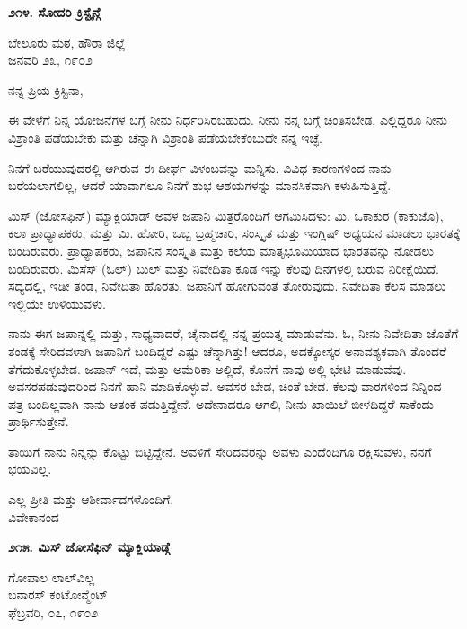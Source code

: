 \begin{center}
\textbf{೨೧೪. ಸೋದರಿ ಕ್ರಿಸ್ಟೈನ್ಗೆ}
\end{center}

\begin{flushright}
ಬೇಲೂರು ಮಠ, ಹೌರಾ ಜಿಲ್ಲೆ\\ಜನವರಿ ೨೩, ೧೯೦೨
\end{flushright}

ನನ್ನ ಪ್ರಿಯ ಕ್ರಿಸ್ಟಿನಾ,

ಈ ವೇಳೆಗೆ ನಿನ್ನ ಯೋಜನೆಗಳ ಬಗ್ಗೆ ನೀನು ನಿರ್ಧರಿಸಿರಬಹುದು. ನೀನು ನನ್ನ ಬಗ್ಗೆ ಚಿಂತಿಸಬೇಡ. ಎಲ್ಲಿದ್ದರೂ ನೀನು ವಿಶ್ರಾಂತಿ ಪಡೆಯಬೇಕು ಮತ್ತು ಚೆನ್ನಾಗಿ ವಿಶ್ರಾಂತಿ ಪಡೆಯಬೇಕೆಂಬುದೇ ನನ್ನ ಇಚ್ಛೆ.

ನಿನಗೆ ಬರೆಯುವುದರಲ್ಲಿ ಆಗಿರುವ ಈ ದೀರ್ಘ ವಿಳಂಬವನ್ನು ಮನ್ನಿಸು. ವಿವಿಧ ಕಾರಣಗಳಿಂದ ನಾನು ಬರೆಯಲಾಗಲಿಲ್ಲ, ಆದರೆ ಯಾವಾಗಲೂ ನಿನಗೆ ಶುಭ ಆಶಯಗಳನ್ನು ಮಾನಸಿಕವಾಗಿ ಕಳುಹಿಸುತ್ತಿದ್ದೆ.

ಮಿಸ್ (ಜೋಸಫಿನ್) ಮ್ಯಾಕ್ಲಿಯಾಡ್ ಅವಳ ಜಪಾನಿ ಮಿತ್ರರೊಂದಿಗೆ ಆಗಮಿಸಿದಳು: ಮಿ. ಒಕಾಕುರ (ಕಾಕುಜೊ), ಕಲಾ ಪ್ರಾಧ್ಯಾಪಕರು, ಮತ್ತು ಮಿ. ಹೋರಿ, ಒಬ್ಬ ಬ್ರಹ್ಮಚಾರಿ, ಸಂಸ್ಕೃತ ಮತ್ತು ಇಂಗ್ಲಿಷ್ ಅಧ್ಯಯನ ಮಾಡಲು ಭಾರತಕ್ಕೆ ಬಂದಿರುವರು. ಪ್ರಾಧ್ಯಾಪಕರು, ಜಪಾನಿನ ಸಂಸ್ಕೃತಿ ಮತ್ತು ಕಲೆಯ ಮಾತೃಭೂಮಿಯಾದ ಭಾರತವನ್ನು ನೋಡಲು ಬಂದಿರುವರು. ಮಿಸೆಸ್ (ಓಲ್) ಬುಲ್ ಮತ್ತು ನಿವೇದಿತಾ ಕೂಡ ಇನ್ನು ಕೆಲವು ದಿನಗಳಲ್ಲಿ ಬರುವ ನಿರೀಕ್ಷೆಯಿದೆ. ಸದ್ಯದಲ್ಲಿ, ಇಡೀ ತಂಡ, ನಿವೇದಿತಾ ಹೊರತು, ಜಪಾನಿಗೆ ಹೋಗುವಂತೆ ತೋರುವುದು. ನಿವೇದಿತಾ ಕೆಲಸ ಮಾಡಲು ಇಲ್ಲಿಯೇ ಉಳಿಯುವಳು.

ನಾನು ಈಗ ಜಪಾನ್ನಲ್ಲಿ ಮತ್ತು, ಸಾಧ್ಯವಾದರೆ, ಚೈನಾದಲ್ಲಿ ನನ್ನ ಪ್ರಯತ್ನ ಮಾಡುವೆನು. ಓ, ನೀನು ನಿವೇದಿತಾ ಜೊತೆಗೆ ತಂಡಕ್ಕೆ ಸೇರಿದವಳಾಗಿ ಜಪಾನಿಗೆ ಬಂದಿದ್ದರೆ ಎಷ್ಟು ಚೆನ್ನಾಗಿತ್ತು! ಆದರೂ, ಅದಕ್ಕೋಸ್ಕರ ಅನಾವಶ್ಯಕವಾಗಿ ತೊಂದರೆ ತೆಗೆದುಕೊಳ್ಳಬೇಡ. ಜಪಾನ್ ಇದೆ, ಮತ್ತು ಅಮೆರಿಕಾ ಅಲ್ಲಿದೆ, ಕೊನೆಗೆ ನಾವು ಅಲ್ಲಿ ಭೇಟಿ ಮಾಡುವೆವು. ಅವಸರಪಡುವುದರಿಂದ ನಿನಗೆ ಹಾನಿ ಮಾಡಿಕೊಳ್ಳುವೆ. ಅವಸರ ಬೇಡ, ಚಿಂತೆ ಬೇಡ. ಕೆಲವು ವಾರಗಳಿಂದ ನಿನ್ನಿಂದ ಪತ್ರ ಬಂದಿಲ್ಲವಾಗಿ ನಾನು ಆತಂಕ ಪಡುತ್ತಿದ್ದೇನೆ. ಅದೇನಾದರೂ ಆಗಲಿ, ನೀನು ಖಾಯಿಲೆ ಬೀಳದಿದ್ದರೆ ಸಾಕೆಂದು ಪ್ರಾರ್ಥಿಸುತ್ತೇನೆ.

ತಾಯಿಗೆ ನಾನು ನಿನ್ನನ್ನು ಕೊಟ್ಟು ಬಿಟ್ಟಿದ್ದೇನೆ. ಅವಳಿಗೆ ಸೇರಿದವರನ್ನು ಅವಳು ಎಂದೆಂದಿಗೂ ರಕ್ಷಿಸುವಳು, ನನಗೆ ಭಯವಿಲ್ಲ.

\begin{flushright}
ಎಲ್ಲ ಪ್ರೀತಿ ಮತ್ತು ಆಶೀರ್ವಾದಗಳೊಂದಿಗೆ,\\ವಿವೇಕಾನಂದ
\end{flushright}

\begin{center}
\textbf{೨೧೫. ಮಿಸ್ ಜೋಸೆಫಿನ್ ಮ್ಯಾಕ್ಲಿಯಾಡ್ಗೆ}
\end{center}

\begin{flushright}
ಗೋಪಾಲ ಲಾಲ್‌ವಿಲ್ಲ\\ಬನಾರಸ್ ಕಂಟೋನ್ಮೆಂಟ್\\ಫೆಬ್ರವರಿ, ೦೭, ೧೯೦೨
\end{flushright}

